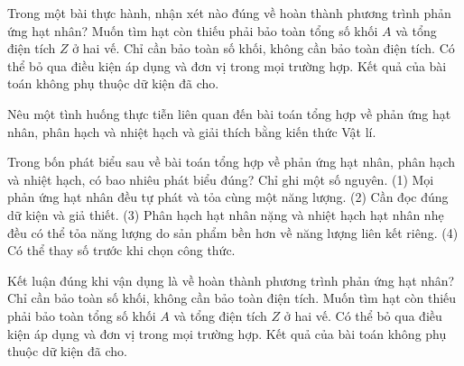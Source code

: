 \begin{ex}
Trong một bài thực hành, nhận xét nào đúng về hoàn thành phương trình phản ứng hạt nhân?
\choice
{\True Muốn tìm hạt còn thiếu phải bảo toàn tổng số khối $A$ và tổng điện tích $Z$ ở hai vế.}
{Chỉ cần bảo toàn số khối, không cần bảo toàn điện tích.}
{Có thể bỏ qua điều kiện áp dụng và đơn vị trong mọi trường hợp.}
{Kết quả của bài toán không phụ thuộc dữ kiện đã cho.}
\end{ex}

\begin{bt}
Nêu một tình huống thực tiễn liên quan đến bài toán tổng hợp về phản ứng hạt nhân, phân hạch và nhiệt hạch và giải thích bằng kiến thức Vật lí.
\end{bt}

\begin{ex}
Trong bốn phát biểu sau về bài toán tổng hợp về phản ứng hạt nhân, phân hạch và nhiệt hạch, có bao nhiêu phát biểu đúng? Chỉ ghi một số nguyên. (1) Mọi phản ứng hạt nhân đều tự phát và tỏa cùng một năng lượng. (2) Cần đọc đúng dữ kiện và giả thiết. (3) Phân hạch hạt nhân nặng và nhiệt hạch hạt nhân nhẹ đều có thể tỏa năng lượng do sản phẩm bền hơn về năng lượng liên kết riêng. (4) Có thể thay số trước khi chọn công thức.
\end{ex}

\begin{ex}
Kết luận đúng khi vận dụng là về hoàn thành phương trình phản ứng hạt nhân?
\choice
{Chỉ cần bảo toàn số khối, không cần bảo toàn điện tích.}
{\True Muốn tìm hạt còn thiếu phải bảo toàn tổng số khối $A$ và tổng điện tích $Z$ ở hai vế.}
{Có thể bỏ qua điều kiện áp dụng và đơn vị trong mọi trường hợp.}
{Kết quả của bài toán không phụ thuộc dữ kiện đã cho.}
\end{ex}


